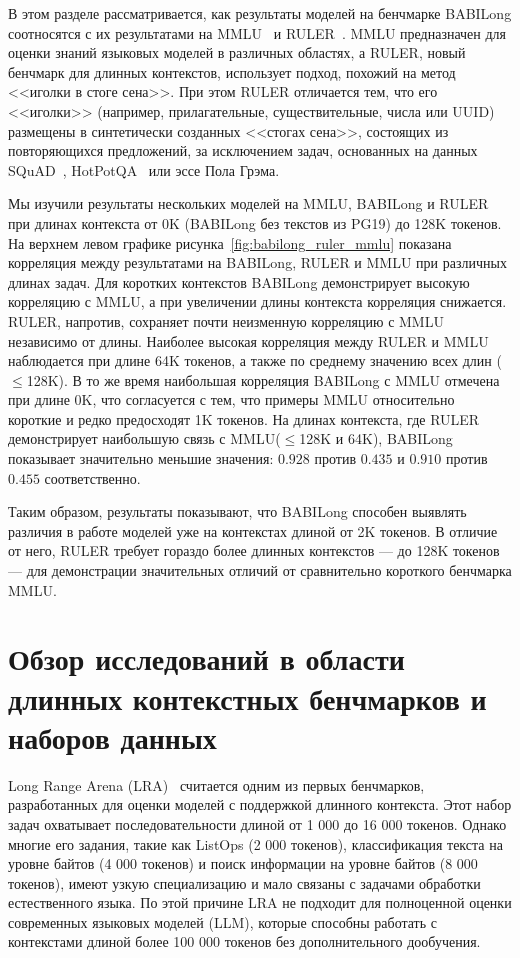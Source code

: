 В этом разделе рассматривается, как результаты моделей на бенчмарке BABILong соотносятся с их результатами на MMLU~\cite{hendrycks2020mmlu} и RULER~\cite{hsieh2024ruler}. MMLU предназначен для оценки знаний языковых моделей в различных областях, а RULER, новый бенчмарк для длинных контекстов, использует подход, похожий на метод <<иголки в стоге сена>>. При этом RULER отличается тем, что его <<иголки>> (например, прилагательные, существительные, числа или UUID) размещены в синтетически созданных <<стогах сена>>, состоящих из повторяющихся предложений, за исключением задач, основанных на данных SQuAD~\cite{rajpurkar2016squad}, HotPotQA~\cite{yang2018hotpotqa} или эссе Пола Грэма.

Мы изучили результаты нескольких моделей на MMLU, BABILong и RULER при длинах контекста от 0K (BABILong без текстов из PG19) до 128K токенов. На верхнем левом графике рисунка~\ref{fig:babilong_ruler_mmlu} показана корреляция между результатами на BABILong, RULER и MMLU при различных длинах задач. Для коротких контекстов BABILong демонстрирует высокую корреляцию с MMLU, а при увеличении длины контекста корреляция снижается. RULER, напротив, сохраняет почти неизменную корреляцию с MMLU независимо от длины. Наиболее высокая корреляция между RULER и MMLU наблюдается при длине 64K токенов, а также по среднему значению всех длин ($\leq$128K). В то же время наибольшая корреляция BABILong с MMLU отмечена при длине 0K, что согласуется с тем, что примеры MMLU относительно короткие и редко предосходят 1K токенов. На длинах контекста, где RULER демонстрирует наибольшую связь с MMLU($\leq$128K и 64K), BABILong показывает значительно меньшие значения: $0.928$ против $0.435$ и $0.910$ против $0.455$ соответственно.

Таким образом, результаты показывают, что BABILong способен выявлять различия в работе моделей уже на контекстах длиной от 2K токенов. В отличие от него, RULER требует гораздо более длинных контекстов — до 128K токенов — для демонстрации значительных отличий от сравнительно короткого бенчмарка MMLU.


\section{Обзор исследований в области длинных контекстных бенчмарков и наборов данных}

Long Range Arena (LRA)~\cite{tay2021long} считается одним из первых бенчмарков, разработанных для оценки моделей с поддержкой длинного контекста. Этот набор задач охватывает последовательности длиной от 1 000 до 16 000 токенов. Однако многие его задания, такие как ListOps (2 000 токенов), классификация текста на уровне байтов (4 000 токенов) и поиск информации на уровне байтов (8 000 токенов), имеют узкую специализацию и мало связаны с задачами обработки естественного языка. По этой причине LRA не подходит для полноценной оценки современных языковых моделей (LLM), которые способны работать с контекстами длиной более 100 000 токенов без дополнительного дообучения.

